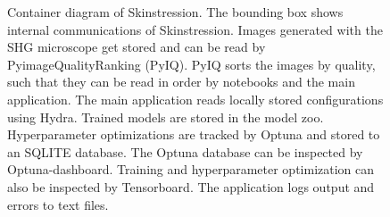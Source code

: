 \begin{figure}
    \centering
    
    \caption[Skinstression container diagram]{
        Container diagram of Skinstression.
        The bounding box shows internal communications of Skinstression.
        Images generated with the SHG microscope get stored and can be read by PyimageQualityRanking (PyIQ).
        PyIQ sorts the images by quality, such that they can be read in order by notebooks and the main application.
        The main application reads locally stored configurations using Hydra.
        Trained models are stored in the model zoo.
        Hyperparameter optimizations are tracked by Optuna and stored to an SQLITE database.
        The Optuna database can be inspected by Optuna-dashboard.
        Training and hyperparameter optimization can also be inspected by Tensorboard.
        The application logs output and errors to text files.
    }

\end{figure}